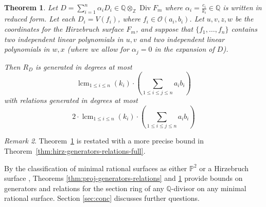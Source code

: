 \documentclass{amsart}
\theoremstyle{plain}
\newtheorem{thm}{Theorem}[subsection]
\theoremstyle{definition}
\theoremstyle{remark}
\newtheorem{rem}[thm]{Remark}
\numberwithin{equation}{subsection}
\newcommand\bq{{\mathbb Q}}
\newcommand\bp{{\mathbb P}}
\newcommand\bz{{\mathbb Z}}
\newcommand\sco{{\mathscr O}}
\DeclareMathOperator\di{Div}
\newcommand\bida{a}
\newcommand\bidb{b}
\newcommand\hirz{F}
\DeclareMathOperator{\lcm}{lcm}
\begin{document}
\begin{thm}
\label{thm:hirz-generators-relations}
Let $D = \sum_{i = 1}^n \alpha_i D_i \in \bq
\otimes_\bz \di \hirz_m$ where $\alpha_i = \frac{c_i}{k_i} \in \bq$ is written in reduced form.  
Let each $D_i = V(f_i)$, where $f_i \in \sco(a_i, b_i)$.
Let $u, v, z, w$ be the coordinates for the Hirzebruch surface
$\hirz_m$, and suppose that $\{f_1, \ldots, f_n\}$
contains two independent 
linear polynomials in $u, v$ and two independent linear polynomials in
$w, x$ {\rm(}where we allow for $\alpha_j = 0$ in the expansion of $D${\rm)}.

Then $R_D$ is generated in degrees at most
\[
	\lcm_{1\le i\le n}(k_i)\cdot \left(\sum_{1\le i\le j\le n} \bida_i \bidb_i\right) 
\]
\noindent
with relations generated in degrees at most 
\[
	2 \cdot \lcm_{1\le i\le n}(k_i) \cdot \left( \sum_{1\le i\le j\le n} \bida_i \bidb_i\right) 
\]
\end{thm}
\begin{rem}
Theorem~\ref{thm:hirz-generators-relations} is restated with a more precise
bound in Theorem~\ref{thm:hirz-generators-relations-full}.
\end{rem}

\noindent
By the classification of minimal rational surfaces
as either $\bp^2$ or a Hirzebruch surface \cite{eisenbud-harris:minimal},
Theorems \ref{thm:proj-generators-relations} and
\ref{thm:hirz-generators-relations} provide bounds on generators
and relations for the section ring of any $\bq$-divisor on any
minimal rational surface. Section \ref{sec:conc} discusses further questions.
\end{document}

